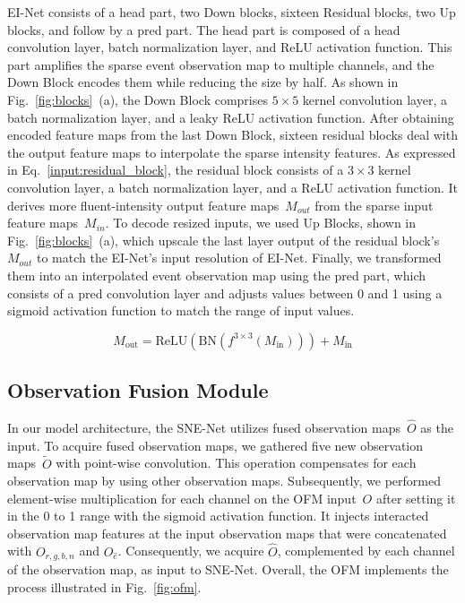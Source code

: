 EI-Net consists of a head part, two Down blocks, sixteen Residual blocks, two Up blocks, and follow by a pred part.
The head part is composed of a head convolution layer, batch normalization layer, and ReLU activation function.
This part amplifies the sparse event observation map to multiple channels, and the Down Block encodes them while reducing the size by half.
As shown in Fig.~\ref{fig:blocks}~(a), the Down Block comprises $5\times5$ kernel convolution layer, a batch normalization layer, and a leaky ReLU activation function.
After obtaining encoded feature maps from the last Down Block, sixteen residual blocks deal with the output feature maps to interpolate the sparse intensity features.
As expressed in Eq.~\ref{input:residual_block}, the residual block consists of a $3\times3$ kernel convolution layer, a batch normalization layer, and a ReLU activation function.
It derives more fluent-intensity output feature maps~$M_{out}$ from the sparse input feature maps~$M_{in}$.
To decode resized inputs, we used Up Blocks, shown in Fig.~\ref{fig:blocks}~(a), which upscale the last layer output of the residual block's $M_{out}$ to match the EI-Net's input resolution of EI-Net.
Finally, we transformed them into an interpolated event observation map using the pred part, which consists of a pred convolution layer and adjusts values between 0 and 1 using a sigmoid activation function to match the range of input values.

\begin{equation}
M_\text{out} = \text{ReLU}(\text{BN}(f^{3 \times 3}(M_\text{in}))) + M_\text{in}
\label{input:residual_block}
\end{equation}

\subsection{Observation Fusion Module}
In our model architecture, the SNE-Net utilizes fused observation maps~$\hat{O}$ as the input.
To acquire fused observation maps, we gathered five new observation maps~$\tilde{O}$ with point-wise convolution.
This operation compensates for each observation map by using other observation maps.
Subsequently, we performed element-wise multiplication for each channel on the OFM input~$O$ after setting it in the 0 to 1 range with the sigmoid activation function.
It injects interacted observation map features at the input observation maps that were concatenated with $O_{r,g,b,n}$ and $O_{\hat{e}}$.
Consequently, we acquire $\hat{O}$, complemented by each channel of the observation map, as input to SNE-Net.
Overall, the OFM implements the process illustrated in Fig.~\ref{fig:ofm}.

